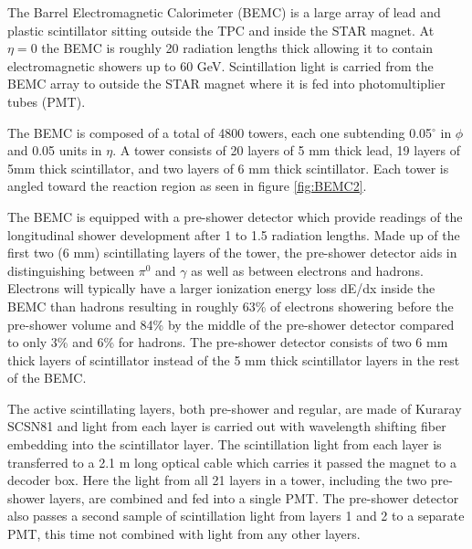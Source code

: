\documentclass[abstract = on,listof=totoc, bibliography=totoc]{scrreprt}
\begin{document}
The Barrel Electromagnetic Calorimeter (BEMC) is a large array of lead and plastic scintillator sitting outside the TPC and inside the STAR magnet. At $\eta = 0$ the BEMC is roughly 20 radiation lengths thick allowing it to contain electromagnetic showers up to 60 GeV. Scintillation light is carried from the BEMC array to outside the STAR magnet where it is fed into photomultiplier tubes (PMT).

The BEMC is composed of a total of 4800 towers, each one subtending 0.05$^\circ$ in $\phi$ and 0.05 units in $\eta$. A tower consists of 20 layers of 5 mm thick lead, 19 layers of 5mm thick scintillator, and two layers of 6 mm thick scintillator. Each tower is angled toward the reaction region as seen in figure \ref{fig:BEMC2}.  

The BEMC is equipped with a pre-shower detector which provide readings of the longitudinal shower development after 1 to 1.5 radiation lengths. Made up of the first two (6 mm) scintillating layers of the tower, the pre-shower detector aids in distinguishing between $\pi^0$ and $\gamma$ as well as between electrons and hadrons. Electrons will typically have a larger ionization energy loss dE/dx inside the BEMC than hadrons resulting in roughly 63\% of electrons showering before the pre-shower volume and 84\% by the middle of the pre-shower detector compared to only 3\% and 6\% for hadrons. The pre-shower detector consists of two 6 mm thick layers of scintillator instead of the 5 mm thick scintillator layers in the rest of the BEMC. 

The active scintillating layers, both pre-shower and regular, are made of Kuraray SCSN81 and light from each layer is carried out with wavelength shifting fiber embedding into the scintillator layer. The scintillation light from each layer is transferred to a 2.1 m long optical cable which carries it passed the magnet to a decoder box. Here the light from all 21 layers in a tower, including the two pre-shower layers, are combined and fed into a single PMT. The pre-shower detector also passes a second sample of scintillation light from layers 1 and 2 to a separate PMT, this time not combined with light from any other layers.  
\end{document}
